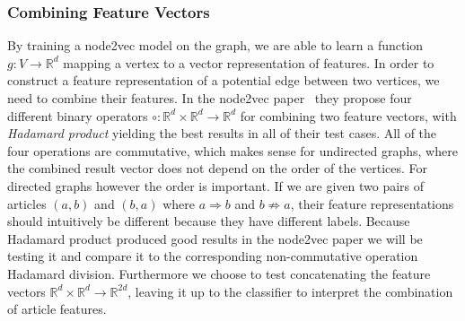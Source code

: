 \subsubsection{Combining Feature Vectors}
By training a node2vec model on the graph, we are able to learn a function $g:V \to \mathbb{R}^d$ mapping a vertex to a vector representation of features. In order to construct a feature representation of a potential edge between two vertices, we need to combine their features. In the node2vec paper~\cite{node2vec} they propose four different binary operators $\circ : \mathbb{R}^d \times \mathbb{R}^d \to \mathbb{R}^d$ for combining two feature vectors, with \textit{Hadamard product} yielding the best results in all of their test cases.
All of the four operations are commutative, which makes sense for undirected graphs, where the combined result vector does not depend on the order of the vertices. For directed graphs however the order is important.
If we are given two pairs of articles $(a,b)$ and $(b,a)$ where $a \Rightarrow b$ and $b \not \Rightarrow a$, their feature representations should intuitively be different because they have different labels.
Because Hadamard product produced good results in the node2vec paper we will be testing it and compare it to the corresponding non-commutative operation Hadamard division. Furthermore we choose to test concatenating the feature vectors $\mathbb{R}^d \times \mathbb{R}^d \to \mathbb{R}^{2d}$, leaving it up to the classifier to interpret the combination of article features.




